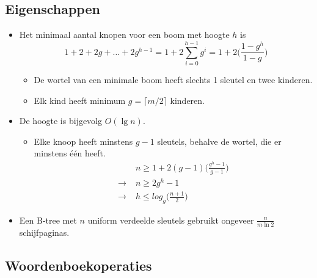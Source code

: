 \subsection{Eigenschappen}
\begin{itemize}
    \item Het minimaal aantal knopen voor een boom met hoogte $h$ is
    $$1 + 2 + 2g + \dots + 2g^{h - 1} = 1 + 2\sum_{i=0}^{h - 1}g^i = 1 + 2\bigg(\frac{1-g^h}{1-g}\bigg) $$
    \begin{itemize}
        \item De wortel van een minimale boom heeft slechts 1 sleutel en twee kinderen.
        \item Elk kind heeft minimum $g = \lceil m/2 \rceil$ kinderen.
    \end{itemize}
    \item De hoogte is bijgevolg $O(\lg n)$.
    \begin{itemize}
        \item Elke knoop heeft minstens $g - 1$ sleutels, behalve de wortel, die er minstens één heeft.
        \begin{align*}
            & n \geq 1 + 2(g - 1)\bigg(\frac{g^h - 1}{g - 1} \bigg) \\
            \rightarrow \;& n \geq 2g^h - 1 \\
            \rightarrow \;& h \leq log_g\bigg(\frac{n+1}{2}\bigg)
        \end{align*}
    \end{itemize}
    \item Een B-tree met $n$ uniform verdeelde sleutels gebruikt ongeveer $\frac{n}{m\ln 2}$ schijfpaginas. 
\end{itemize}

\subsection{Woordenboekoperaties}

